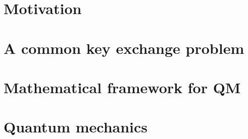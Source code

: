 \documentclass[titlepage]{report}
\theoremstyle{remark}
\begin{document}



\tableofcontents

%

\chapter{Motivation}

		
 \chapter{A common key exchange problem}
 
% 
%
% 
% 
% 

\begin{appendices}
	\chapter{Mathematical framework for QM}
	
	\chapter{Quantum mechanics}
	
\end{appendices}

%
\printbibliography
\end{document}
